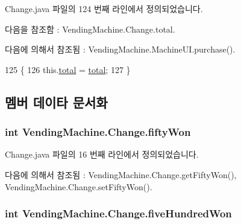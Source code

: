 Change.\+java 파일의 124 번째 라인에서 정의되었습니다.



다음을 참조함 \+:  Vending\+Machine.\+Change.\+total.



다음에 의해서 참조됨 \+:  Vending\+Machine.\+Machine\+U\+I.\+purchase().


\begin{DoxyCode}
125     \{
126         this.\hyperlink{class_vending_machine_1_1_change_aaa54155607801f52da0a520ef638e51d}{total} = \hyperlink{class_vending_machine_1_1_change_aaa54155607801f52da0a520ef638e51d}{total};
127     \}
\end{DoxyCode}


\subsection{멤버 데이타 문서화}
\subsubsection[{\texorpdfstring{fifty\+Won}{fiftyWon}}]{\setlength{\rightskip}{0pt plus 5cm}int Vending\+Machine.\+Change.\+fifty\+Won\hspace{0.3cm}{\ttfamily [private]}}\hypertarget{class_vending_machine_1_1_change_a7559b56180084c477b10aebae956e13f}{}\label{class_vending_machine_1_1_change_a7559b56180084c477b10aebae956e13f}


Change.\+java 파일의 16 번째 라인에서 정의되었습니다.



다음에 의해서 참조됨 \+:  Vending\+Machine.\+Change.\+get\+Fifty\+Won(), Vending\+Machine.\+Change.\+set\+Fifty\+Won().

\subsubsection[{\texorpdfstring{five\+Hundred\+Won}{fiveHundredWon}}]{\setlength{\rightskip}{0pt plus 5cm}int Vending\+Machine.\+Change.\+five\+Hundred\+Won\hspace{0.3cm}{\ttfamily [private]}}\hypertarget{class_vending_machine_1_1_change_a83d616c8b0b5c5b560edaeb06d2e3dc0}{}\label{class_vending_machine_1_1_change_a83d616c8b0b5c5b560edaeb06d2e3dc0}


